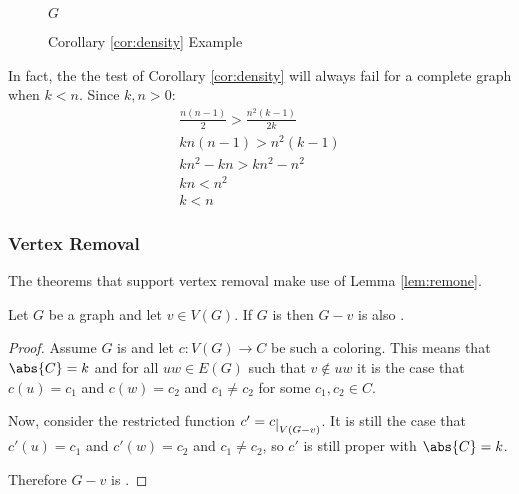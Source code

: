 \begin{figure}[h]
  \label{fig:density}
  \begin{center}

    \bigskip

    \(G\)
  \end{center}
  \caption{Corollary \ref{cor:density} Example}
\end{figure}

In fact, the the test of Corollary \ref{cor:density} will always fail for a complete graph when \(k<n\).  Since
\(k,n>0\):
\begin{gather*}
  \frac{n(n-1)}{2}>\frac{n^2(k-1)}{2k} \\
  kn(n-1)>n^2(k-1) \\
  kn^2-kn>kn^2-n^2 \\
  kn<n^2 \\
  k<n
\end{gather*}

\subsubsection{Vertex Removal}

The theorems that support vertex removal make use of Lemma \ref{lem:remone}.

\begin{lemma}
  \label{lem:remone}
  Let \(G\) be a graph and let \(v\in V(G)\).  If \(G\) is  then \(G-v\) is also .
\end{lemma}

\begin{proof}
  Assume \(G\) is  and let \(c:V(G)\to C\) be such a coloring.  This means that \(\abs{C}=k\) and for
  all \(uw\in E(G)\) such that \(v\notin uw\) it is the case that \(c(u)=c_1\) and \(c(w)=c_2\) and \(c_1\ne c_2\)
  for some \(c_1,c_2\in C\).

  Now, consider the restricted function \(c'=\restrict{c}{V(G-v)}\).  It is still the case that \(c'(u)=c_1\) and
  \(c'(w)=c_2\) and \(c_1\ne c_2\), so \(c'\) is still proper with \(\abs{C}=k\).

  Therefore \(G-v\) is .
\end{proof}

